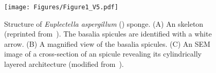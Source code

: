 \begin{figure}[ht]
\centering
\texttt{[image: Figures/Figure1\_V5.pdf]}
\caption{Structure of \textit{Euplectella aspergillum} (\EA) sponge. (\textsf{A}) An \EA skeleton (reprinted from~\cite{monn2015new}). The basalia spicules are identified with a white arrow. (\textsf{B}) A magnified view of the basalia spicules. (\textsf{C}) An SEM image of a cross-section of an \EA  spicule revealing its cylindrically layered architecture (modified from~\cite{monn2015new}).}
\label{fig:eastructure}
\end{figure}
